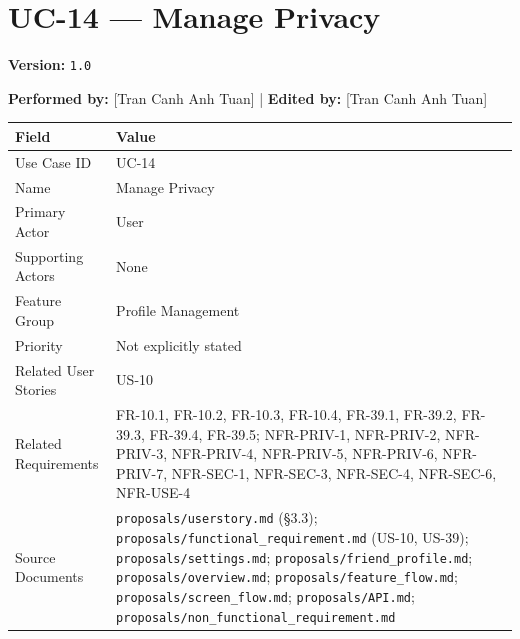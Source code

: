 \documentclass[12pt]{article}
\renewcommand{\baselinestretch}{1.5}
\begin{document}
\pagebreak
\hypertarget{sec:uc-14-manage-privacy}{}
\section*{UC-14 --- Manage Privacy}
\par\medskip

\textbf{Version:} \texttt{1.0}
\par\medskip

\textbf{Performed by:} [Tran Canh Anh Tuan] | \textbf{Edited by:} [Tran Canh Anh Tuan]
\par\medskip

\begingroup
\small
\renewcommand{\baselinestretch}{1.0}\selectfont
\renewcommand{\arraystretch}{1.15}
\setlength{\tabcolsep}{6pt}
\begin{longtable}{|>{\raggedright\arraybackslash}p{}|>{\raggedright\arraybackslash}p{}|}
\hline
\textbf{Field} & \textbf{Value} \\ \hline
\endhead
Use Case ID & UC-14 \\ \hline
Name & Manage Privacy \\ \hline
Primary Actor & User \\ \hline
Supporting Actors & None \\ \hline
Feature Group & Profile Management \\ \hline
Priority & Not explicitly stated \\ \hline
Related User Stories & US-10 \\ \hline
Related Requirements & FR-10.1, FR-10.2, FR-10.3, FR-10.4, FR-39.1, FR-39.2, FR-39.3, FR-39.4, FR-39.5; NFR-PRIV-1, NFR-PRIV-2, NFR-PRIV-3, NFR-PRIV-4, NFR-PRIV-5, NFR-PRIV-6, NFR-PRIV-7, NFR-SEC-1, NFR-SEC-3, NFR-SEC-4, NFR-SEC-6, NFR-USE-4 \\ \hline
Source Documents & \texttt{proposals/userstory.md} (§3.3); \texttt{proposals/functional\_requirement.md} (US-10, US-39); \texttt{proposals/settings.md}; \texttt{proposals/friend\_profile.md}; \texttt{proposals/overview.md}; \texttt{proposals/feature\_flow.md}; \texttt{proposals/screen\_flow.md}; \texttt{proposals/API.md}; \texttt{proposals/non\_functional\_requirement.md} \\ \hline
\end{longtable}
\endgroup
\par\medskip

\hypertarget{sec:part-a-use-case-model}{}
\end{document}
